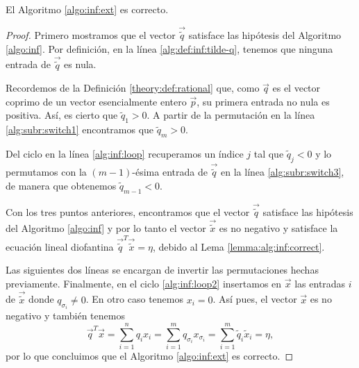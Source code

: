 \begin{theorem}
	\label{th:alg:inf}
	El Algoritmo \ref{algo:inf:ext} es correcto.
\end{theorem}
\begin{proof}
	Primero mostramos que el vector $\vec{\tilde{q}}$ satisface las hipótesis del Algoritmo
	\ref{algo:inf}. Por definición, en la línea \eqref{alg:def:inf:tilde-q}, tenemos que ninguna
	entrada de $\vec{\tilde{q}}$ es nula.

	Recordemos de la Definición \ref{theory:def:rational} que, como $\vec{q}$ es el vector coprimo
	de un vector esencialmente entero $\vec{p}$, su primera entrada no nula es positiva. Así, es
	cierto que $\tilde{q}_1 > 0$. A partir de la permutación en la línea \eqref{alg:subr:switch1}
	encontramos que $\tilde{q}_m > 0$.

	Del ciclo en la línea \eqref{alg:inf:loop} recuperamos un índice $j$ tal que $\tilde{q}_j < 0$ y
	lo permutamos con la $(m - 1)$-ésima entrada de $\vec{\tilde{q}}$ en la línea
	\eqref{alg:subr:switch3}, de manera que obtenemos $\tilde{q}_{m-1} < 0$.

	Con los tres puntos anteriores, encontramos que el vector $\vec{\tilde{q}}$ satisface las
	hipótesis del Algoritmo \ref{algo:inf} y por lo tanto el vector $\vec{\tilde{x}}$ es no negativo
	y satisface la ecuación lineal diofantina $\vec{\tilde{q}}^T\vec{\tilde{x}} = \eta$, debido al
	Lema \ref{lemma:alg:inf:correct}.

	Las siguientes dos líneas se encargan de invertir las permutaciones hechas previamente.
	Finalmente, en el ciclo \eqref{alg:inf:loop2} insertamos en $\vec{x}$ las entradas $i$ de
	$\vec{\tilde{x}}$ donde $q_{\sigma_i} \neq 0$. En otro caso tenemos $x_i = 0$. Así pues, el
	vector $\vec{x}$ es no negativo y también tenemos
	\begin{equation*}
		\vec{q}^T\vec{x} = \sum_{i = 1}^{n}q_ix_i
		= \sum_{i = 1}^{m}q_{\sigma_i}x_{\sigma_i}
		= \sum_{i = 1}^{m}\tilde{q}_i\tilde{x}_i
		= \eta,
	\end{equation*}
	por lo que concluimos que el Algoritmo \ref{algo:inf:ext} es correcto.
\end{proof}

